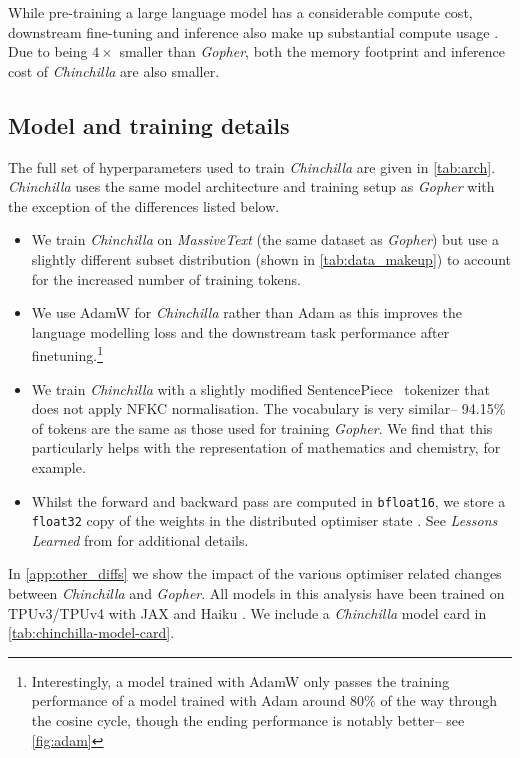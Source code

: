 While pre-training a large language model has a considerable compute cost, downstream fine-tuning and inference also make up substantial compute usage \citep{rae2021gopher}. Due to being $4 \times$ smaller than \textit{Gopher}, both the memory footprint and inference cost of \textit{Chinchilla} are also smaller.

\subsection{Model and training details}
\label{method:models}
The full set of hyperparameters used to train \textit{Chinchilla} are given in \autoref{tab:arch}.
\textit{Chinchilla} uses the same model architecture and training setup as \textit{Gopher} with the exception of the differences listed below.

\begin{itemize}
    \item We train \textit{Chinchilla} on \textit{MassiveText} (the same dataset as \textit{Gopher}) but use a slightly different subset distribution (shown in \autoref{tab:data_makeup}) to account for the increased number of training tokens.
    \item We use AdamW \citep{loshchilov2018decoupled} for \textit{Chinchilla} rather than Adam \citep{kingma2014adam} as this improves the language modelling loss and the downstream task performance after finetuning.\footnote{Interestingly, a model trained with AdamW only passes the training performance of a model trained with Adam around 80\% of the way through the cosine cycle, though the ending performance is notably better-- see \autoref{fig:adam}} 
    \item We train \textit{Chinchilla} with a slightly modified SentencePiece~\citep{kudo2018sentencepiece} tokenizer that does not apply NFKC normalisation. The vocabulary is very similar-- 94.15\% of tokens are the same as those used for training \textit{Gopher}. 
    We find that this particularly helps with the representation of mathematics and chemistry, for example.
    \item Whilst the forward and backward pass are computed in \texttt{bfloat16}, we store a \texttt{float32} copy of the weights in the distributed optimiser state \citep{rajbhandari2020zero}. See \textit{Lessons Learned} from \citet{rae2021gopher} for additional details.
\end{itemize}

In \autoref{app:other_diffs} we show the impact of the various optimiser related changes between \textit{Chinchilla} and \textit{Gopher}.
All models in this analysis have been trained on TPUv3/TPUv4 \citep{10.1145/3079856.3080246} with JAX \citep{jax2018github} and Haiku \citep{haiku2020github}. We include a \textit{Chinchilla} model card \citep{mitchell2019model} in \autoref{tab:chinchilla-model-card}.

